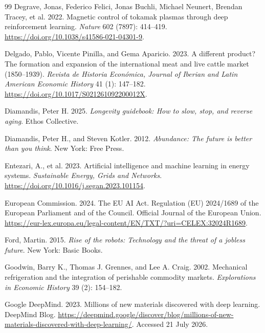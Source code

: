 \documentclass[11pt]{article}
\begin{document}
\begin{thebibliography}{99}
Degrave, Jonas, Federico Felici, Jonas Buchli, Michael Neunert, Brendan Tracey, et al. 2022. Magnetic control of tokamak plasmas through deep reinforcement learning. \textit{Nature} 602 (7897): 414--419. \url{https://doi.org/10.1038/s41586-021-04301-9}.

Delgado, Pablo, Vicente Pinilla, and Gema Aparicio. 2023. A different product? The formation and expansion of the international meat and live cattle market (1850--1939). \textit{Revista de Historia Econ\'omica, Journal of Iberian and Latin American Economic History} 41 (1): 147--182. \url{https://doi.org/10.1017/S021261092200012X}.

Diamandis, Peter H. 2025. \textit{Longevity guidebook: How to slow, stop, and reverse aging}. Ethos Collective.

Diamandis, Peter H., and Steven Kotler. 2012. \textit{Abundance: The future is better than you think}. New York: Free Press.

Entezari, A., et al. 2023. Artificial intelligence and machine learning in energy systems. \textit{Sustainable Energy, Grids and Networks}. \url{https://doi.org/10.1016/j.segan.2023.101154}.

European Commission. 2024. The EU AI Act. Regulation (EU) 2024/1689 of the European Parliament and of the Council. Official Journal of the European Union. \url{https://eur-lex.europa.eu/legal-content/EN/TXT/?uri=CELEX:32024R1689}.

Ford, Martin. 2015. \textit{Rise of the robots: Technology and the threat of a jobless future}. New York: Basic Books.


Goodwin, Barry K., Thomas J. Grennes, and Lee A. Craig. 2002. Mechanical refrigeration and the integration of perishable commodity markets. \textit{Explorations in Economic History} 39 (2): 154--182.

Google DeepMind. 2023. Millions of new materials discovered with deep learning. DeepMind Blog. \url{https://deepmind.google/discover/blog/millions-of-new-materials-discovered-with-deep-learning/}. Accessed 21 July 2026.


\end{thebibliography}
\end{document}
